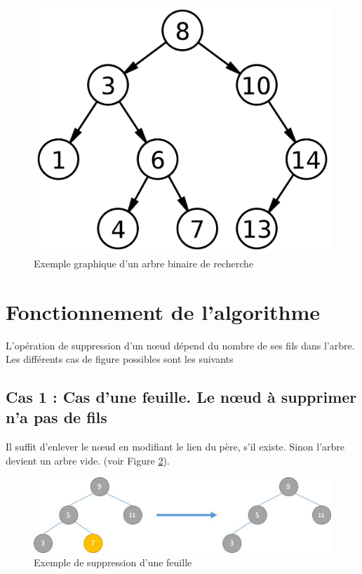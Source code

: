 \begin{figure}[H]
    \centering
        \includegraphics[scale=0.2]{./ressources/arbre.png}
        \caption{Exemple graphique d'un arbre binaire de recherche}
    \label{fig:arb}
\end{figure}

\section{Fonctionnement de l'algorithme}
L’opération de suppression d’un nœud dépend du nombre de ses fils dans l’arbre. Les différents cas de figure possibles sont les suivants

\subsection{Cas 1 : Cas d’une feuille. Le nœud à supprimer n’a pas de fils}
Il suffit d'enlever le nœud en modifiant le lien du père, s’il existe. Sinon l'arbre devient un arbre vide.  (voir Figure \ref{fig:d1}).
\begin{figure}[H]
    \centering
        \includegraphics[scale=0.8]{./ressources/d1.jpeg}
        \caption{Exemple de suppression d'une feuille}
    \label{fig:d1}
\end{figure}

